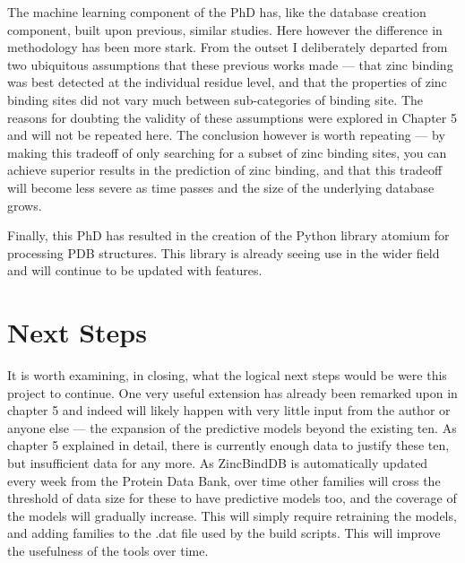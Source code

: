 The machine learning component of the PhD has, like the database creation component, built upon previous, similar studies. Here however the difference in methodology has been more stark. From the outset I deliberately departed from two ubiquitous assumptions that these previous works made --- that zinc binding was best detected at the individual residue level, and that the properties of zinc binding sites did not vary much between sub-categories of binding site. The reasons for doubting the validity of these assumptions were explored in Chapter 5 and will not be repeated here. The conclusion however is worth repeating --- by making this tradeoff of only searching for a subset of zinc binding sites, you can achieve superior results in the prediction of zinc binding, and that this tradeoff will become less severe as time passes and the size of the underlying database grows.

Finally, this PhD has resulted in the creation of the Python library atomium for processing PDB structures. This library is already seeing use in the wider field and will continue to be updated with features.

\section{Next Steps}

It is worth examining, in closing, what the logical next steps would be were this project to continue. One very useful extension has already been remarked upon in chapter 5 and indeed will likely happen with very little input from the author or anyone else --- the expansion of the predictive models beyond the existing ten. As chapter 5 explained in detail, there is currently enough data to justify these ten, but insufficient data for any more. As ZincBindDB is automatically updated every week from the Protein Data Bank, over time other families will cross the threshold of data size for these to have predictive models too, and the coverage of the models will gradually increase. This will simply require retraining the models, and adding families to the .dat file used by the build scripts. This will improve the usefulness of the tools over time.

